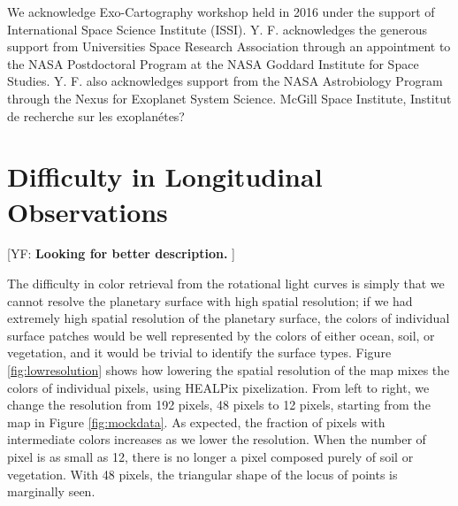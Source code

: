 \documentclass[iop,numberedappendix,apj,]{emulateapj}
\def\memoYF#1{\color{red}[YF: {\bf #1}]\color{black}}
\begin{document}
\acknowledgements

We acknowledge Exo-Cartography workshop held in 2016 under the support of International Space Science Institute (ISSI). 
Y. F. acknowledges the generous support from Universities Space Research Association through an appointment to the NASA Postdoctoral Program at the NASA Goddard Institute for Space Studies. 
Y. F. also acknowledges support from the NASA Astrobiology Program through the Nexus for Exoplanet System Science.
McGill Space Institute, Institut de recherche sur les exoplan\'etes? 




\appendix




\section{Difficulty in Longitudinal Observations}

\memoYF{Looking for better description. }

The difficulty in color retrieval from the rotational light curves is simply that we cannot resolve the planetary surface with high spatial resolution; if we had extremely high spatial resolution of the planetary surface, the colors of individual surface patches would be well represented by the colors of either ocean, soil, or vegetation, and it would be trivial to identify the surface types. 
Figure \ref{fig:lowresolution} shows how lowering the spatial resolution of the map mixes the colors of individual pixels, using HEALPix pixelization. 
From left to right, we change the resolution from 192 pixels, 48 pixels to 12 pixels, starting from the map in Figure \ref{fig:mockdata}. 
As expected, the fraction of pixels with intermediate colors increases as we lower the resolution. 
When the number of pixel is as small as 12, there is no longer a pixel composed purely of soil or vegetation. 
With 48 pixels, the triangular shape of the locus of points is marginally seen. 
\end{document}

